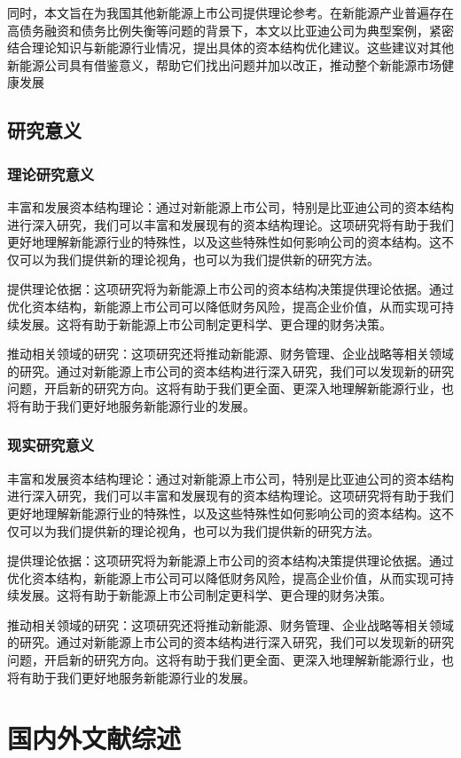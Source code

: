 同时，本文旨在为我国其他新能源上市公司提供理论参考。在新能源产业普遍存在高债务融资和债务比例失衡等问题的背景下，本文以比亚迪公司为典型案例，紧密结合理论知识与新能源行业情况，提出具体的资本结构优化建议。这些建议对其他新能源公司具有借鉴意义，帮助它们找出问题并加以改正，推动整个新能源市场健康发展
\subsection{研究意义}
\subsubsection{理论研究意义}
 丰富和发展资本结构理论：通过对新能源上市公司，特别是比亚迪公司的资本结构进行深入研究，我们可以丰富和发展现有的资本结构理论。这项研究将有助于我们更好地理解新能源行业的特殊性，以及这些特殊性如何影响公司的资本结构。这不仅可以为我们提供新的理论视角，也可以为我们提供新的研究方法。

提供理论依据：这项研究将为新能源上市公司的资本结构决策提供理论依据。通过优化资本结构，新能源上市公司可以降低财务风险，提高企业价值，从而实现可持续发展。这将有助于新能源上市公司制定更科学、更合理的财务决策。

推动相关领域的研究：这项研究还将推动新能源、财务管理、企业战略等相关领域的研究。通过对新能源上市公司的资本结构进行深入研究，我们可以发现新的研究问题，开启新的研究方向。这将有助于我们更全面、更深入地理解新能源行业，也将有助于我们更好地服务新能源行业的发展。
\subsubsection{现实研究意义}
丰富和发展资本结构理论：通过对新能源上市公司，特别是比亚迪公司的资本结构进行深入研究，我们可以丰富和发展现有的资本结构理论。这项研究将有助于我们更好地理解新能源行业的特殊性，以及这些特殊性如何影响公司的资本结构。这不仅可以为我们提供新的理论视角，也可以为我们提供新的研究方法。

提供理论依据：这项研究将为新能源上市公司的资本结构决策提供理论依据。通过优化资本结构，新能源上市公司可以降低财务风险，提高企业价值，从而实现可持续发展。这将有助于新能源上市公司制定更科学、更合理的财务决策。

推动相关领域的研究：这项研究还将推动新能源、财务管理、企业战略等相关领域的研究。通过对新能源上市公司的资本结构进行深入研究，我们可以发现新的研究问题，开启新的研究方向。这将有助于我们更全面、更深入地理解新能源行业，也将有助于我们更好地服务新能源行业的发展。

\section{国内外文献综述}

